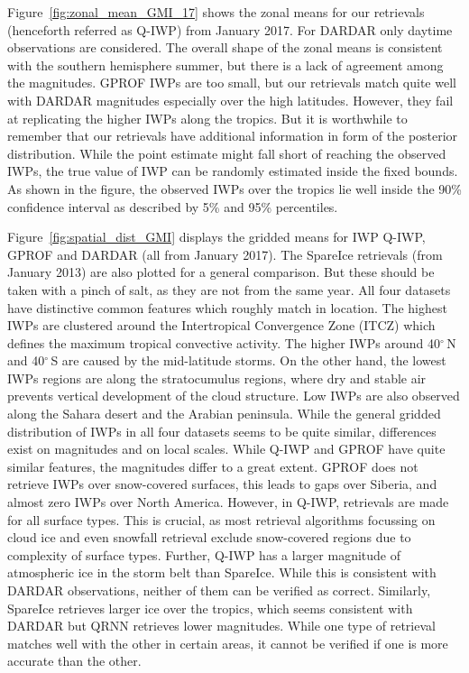 \documentclass[amt, manuscript]{copernicus}
\begin{document}
Figure~\ref{fig:zonal_mean_GMI_17} shows the zonal means for our retrievals (henceforth referred as Q-IWP) from January 2017. For DARDAR only daytime observations are considered. The overall shape of the zonal means is consistent with the southern hemisphere summer, but there is a lack of agreement among the magnitudes. GPROF IWPs are too small, but our retrievals match quite well with DARDAR magnitudes especially over the high latitudes. However, they fail at replicating the higher IWPs along the tropics. But it is worthwhile to remember that our retrievals have additional information in form of the  posterior distribution. While the point estimate might fall short of reaching the observed IWPs, the true value of IWP can be randomly estimated inside the fixed bounds. As shown in the figure, the observed IWPs over the tropics lie well inside the 90\% confidence interval as described by 5\% and 95\% percentiles.
  

Figure~\ref{fig:spatial_dist_GMI} displays the gridded means for IWP Q-IWP, GPROF and DARDAR (all from January 2017). The SpareIce retrievals (from January 2013) are also plotted for a general comparison. But these should be taken with a pinch of salt, as they are not from the same year. All four datasets have distinctive common features which roughly match in location. The highest IWPs are clustered around the Intertropical  Convergence Zone (ITCZ) which defines the maximum tropical convective activity. The higher IWPs around 40$^\circ$\,N and 40$^\circ$\,S are caused by the mid-latitude storms. On the other hand, the lowest IWPs regions are along the stratocumulus regions, where dry and stable air prevents vertical development of the cloud structure. Low IWPs are also observed along the Sahara desert and the Arabian peninsula. While the general gridded distribution of IWPs in all four datasets seems to be quite similar, differences exist on magnitudes and on local scales. While Q-IWP and GPROF have quite similar features, the magnitudes differ to a great extent. GPROF does not retrieve IWPs over snow-covered surfaces, this leads to gaps over Siberia, and almost zero IWPs over North America. However, in Q-IWP, retrievals are made for all surface types. This is crucial, as most retrieval algorithms focussing on cloud ice and even snowfall retrieval \citep{rysman:slalom:18} exclude snow-covered regions due to complexity of surface types. Further, Q-IWP has a larger magnitude of atmospheric ice in the storm belt than SpareIce. While this is consistent with DARDAR observations, neither of them can be verified as correct. Similarly, SpareIce retrieves larger ice over the tropics, which seems consistent with DARDAR but QRNN retrieves lower magnitudes. While one type of retrieval matches well with the other in certain areas, it cannot be verified if one is more accurate than the other.  
\end{document}
